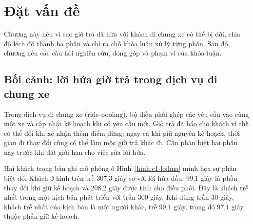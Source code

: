 \chapter{Đặt vấn đề}
\label{chuong:modau}

Chương này nêu vì sao giờ trả đã hứa với khách đi chung xe có thể bị dời, chia độ lệch đó thành ba phần và chỉ ra
chỗ khóa luận xử lý từng phần. Sau đó, chương nêu các câu hỏi nghiên cứu, đóng góp và phạm vi của khóa luận.

\section{Bối cảnh: lời hứa giờ trả trong dịch vụ đi chung xe}
\label{muc:c1-boicanh}

Trong dịch vụ đi chung xe (ride-pooling), bộ điều phối ghép các yêu cầu vào cùng một xe và cập nhật kế hoạch khi
có yêu cầu mới. Giờ trả đã báo cho khách vì thế có thể đổi khi xe nhận thêm điểm dừng; ngay cả khi giữ nguyên
kế hoạch, thời gian đi thay đổi cũng có thể làm mốc giờ trả khác đi. Cần phân biệt hai phần này trước khi đặt
giới hạn cho việc sửa lời hứa.

Hai khách trong bản ghi mô phỏng ở Hình~\ref{hinh:c1-loihua} minh họa sự phân biệt đó. Khách ở hình trên trễ
307,3 giây so với lời hứa đầu: 99,1 giây là phần thay đổi khi giữ kế hoạch và 208,2 giây được tính cho điều phối.
Đây là khách trễ nhất trong một kịch bản phát triển với trần 300 giây. Khi dùng trần 30 giây, khách trễ nhất
của kịch bản là một người khác, trễ 99,1 giây, trong đó 97,1 giây thuộc phần giữ kế hoạch.

